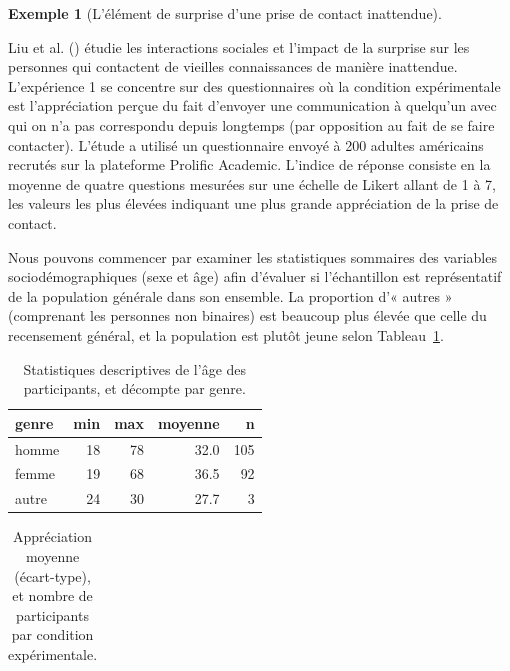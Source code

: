 \documentclass[
  11pt,
  letterpaper,
]{scrbook}
\theoremstyle{plain}
\theoremstyle{plain}
\theoremstyle{definition}
\newtheorem{example}{Exemple}[chapter]
\theoremstyle{definition}
\theoremstyle{remark}
\begin{document}
\begin{example}[L'élément de surprise d'une prise de contact
inattendue]\protect\hypertarget{exm-LiuRimMinMin2023E1}{}\label{exm-LiuRimMinMin2023E1}

Liu et al. () étudie les
interactions sociales et l'impact de la surprise sur les personnes qui
contactent de vieilles connaissances de manière inattendue. L'expérience
1 se concentre sur des questionnaires où la condition expérimentale est
l'appréciation perçue du fait d'envoyer une communication à quelqu'un
avec qui on n'a pas correspondu depuis longtemps (par opposition au fait
de se faire contacter). L'étude a utilisé un questionnaire envoyé à 200
adultes américains recrutés sur la plateforme Prolific Academic.
L'indice de réponse consiste en la moyenne de quatre questions mesurées
sur une échelle de Likert allant de 1 à 7, les valeurs les plus élevées
indiquant une plus grande appréciation de la prise de contact.

Nous pouvons commencer par examiner les statistiques sommaires des
variables sociodémographiques (sexe et âge) afin d'évaluer si
l'échantillon est représentatif de la population générale dans son
ensemble. La proportion d'« autres » (comprenant les personnes non
binaires) est beaucoup plus élevée que celle du recensement général, et
la population est plutôt jeune selon
Tableau~\ref{tbl-LRMMS1-summarystat-a}.

\begin{longtable}[t]{lrrrr}

\caption{\label{tbl-LRMMS1-summarystat-a}Statistiques descriptives de
l'âge des participants, et décompte par genre.}

\tabularnewline

\toprule
genre & min & max & moyenne & n\\
\midrule
homme & 18 & 78 & 32.0 & 105\\
femme & 19 & 68 & 36.5 & 92\\
autre & 24 & 30 & 27.7 & 3\\
\bottomrule

\end{longtable}

\begin{longtable}[t]{lrrr}

\caption{\label{tbl-LRMMS1-summarystat-b}Appréciation moyenne
(écart-type), et nombre de participants par condition expérimentale.}

\tabularnewline


\end{longtable}
\end{example}
\end{document}
